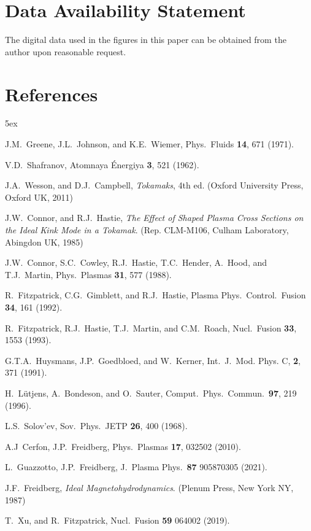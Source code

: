 \documentclass[12pt,prb,aps]{revtex4-1}
\begin{document}
\section*{Data Availability Statement}
The digital data used in the figures in this paper can be obtained from the author upon reasonable request.

\section*{References}
\begin{thebibliography}{99}\baselineskip 5ex

 J.M.~Greene, J.L.~Johnson, and K.E.~Wiemer,  Phys.\  Fluids  {\bf 14}, 671 (1971).

 V.D.~Shafranov, Atomnaya \'{E}nergiya {\bf 3}, 521  (1962).

 J.A.~Wesson, and D.J.~Campbell, {\em Tokamaks}, 4th ed. (Oxford University Press, Oxford UK, 2011)


 J.W.~Connor, and R.J.~Hastie, {\em The Effect of Shaped Plasma Cross Sections on the Ideal Kink Mode in a Tokamak}. (Rep. CLM-M106, Culham Laboratory, Abingdon UK, 1985)

  J.W.~Connor, S.C.~Cowley, R.J.~Hastie, T.C.~Hender, A.~Hood, and T.J.~Martin, Phys.\ Plasmas {\bf 31}, 577 (1988).

 R.~Fitzpatrick, C.G.~Gimblett, and R.J.~Hastie, Plasma Phys.\ Control.\ Fusion {\bf 34}, 161 (1992). 

 R.~Fitzpatrick, R.J.~Hastie, T.J.~Martin, and C.M.~Roach,  Nucl.\ Fusion {\bf 33}, 1553 (1993).

 G.T.A.~Huysmans, J.P.~Goedbloed, and W.~Kerner, Int.\ J.\ Mod. Phys. C,  {\bf 2}, 371 (1991).

 H.~L\"{u}tjens, A.~Bondeson, and O.~Sauter, Comput.\ Phys.\ Commun.\ {\bf 97}, 219 (1996).

 L.S.~Solov'ev, Sov.\ Phys.\ JETP {\bf 26}, 400 (1968).

 A.J~Cerfon, J.P.~Freidberg, Phys.\  Plasmas  {\bf 17},  032502 (2010).

 L.~Guazzotto, J.P.~Freidberg, J.\  Plasma Phys.\ {\bf 87}  905870305 (2021).

 J.F.~Freidberg, {\em Ideal Magnetohydrodynamics}. (Plenum Press, New York NY, 1987)

 T.~Xu, and R.~Fitzpatrick, Nucl.\ Fusion {\bf 59}  064002 (2019).


\end{thebibliography}
\end{document}
